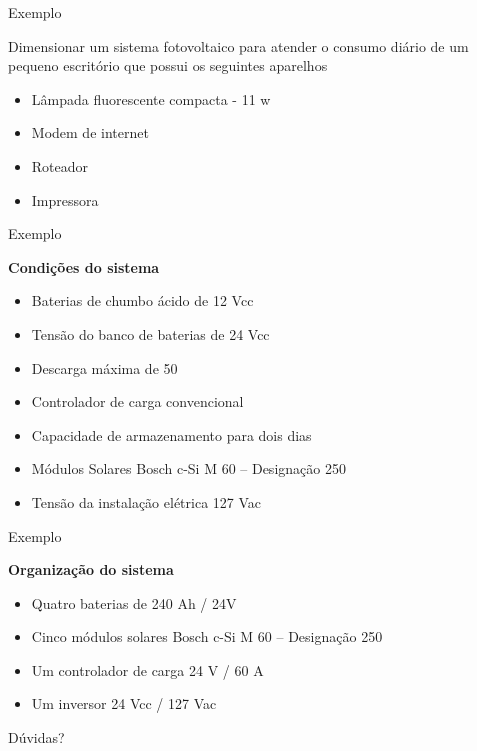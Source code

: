 \begin{frame}{Exemplo}

Dimensionar um sistema fotovoltaico para atender o consumo diário de um pequeno escritório que possui os seguintes aparelhos

\begin{itemize}
\item Lâmpada fluorescente compacta - 11 w
\item Modem de internet
\item Roteador
\item Impressora 
\end{itemize}

\end{frame}
\begin{frame}{Exemplo}

\textbf{Condições do sistema
}

\begin{itemize}
\item Baterias de chumbo ácido de 12 Vcc
\item Tensão do banco de baterias de 24 Vcc
\item Descarga máxima de 50%
\item Controlador de carga convencional
\item Capacidade de armazenamento para dois dias
\item Módulos Solares Bosch c-Si M 60 – Designação 250
\item Tensão da instalação elétrica 127 Vac
\end{itemize}

\end{frame}

\begin{frame}{Exemplo}

\textbf{Organização do sistema
}

\begin{itemize}
\item Quatro baterias de 240 Ah / 24V
\item Cinco módulos solares Bosch c-Si M 60 – Designação 250
\item Um controlador de carga 24 V / 60 A
\item Um inversor 24 Vcc / 127 Vac

\end{itemize}

\end{frame}



\begin{frame}{Dúvidas?}

\end{frame}



